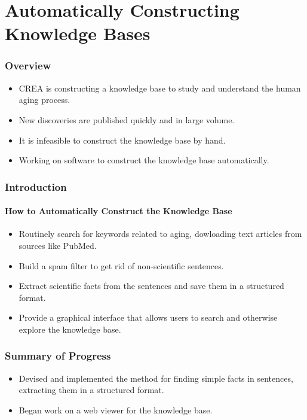 \documentclass[mathserif]{beamer}
\begin{document}
\section{Automatically Constructing Knowledge Bases}

\begin{frame}

\frametitle{Overview}

\begin{itemize}[<+->]

\item CREA is constructing a knowledge base to study and
understand the human aging process.
\item New discoveries are published quickly and in large
volume.
\item It is infeasible to construct the knowledge base by
hand.
\item Working on software to construct the knowledge base
automatically.

\end{itemize}

\end{frame}

\begin{frame}

\frametitle{Introduction}
\framesubtitle{How to Automatically Construct the Knowledge Base}

\begin{itemize}[<+->]

\item Routinely search for keywords related to aging, dowloading
text articles from sources like PubMed.
\item Build a spam filter to get rid of non-scientific sentences.
\item Extract scientific facts from the sentences and save them
in a structured format.
\item Provide a graphical interface that allows users to search
and otherwise explore the knowledge base.

\end{itemize}

\end{frame}

\begin{frame}

\frametitle{Summary of Progress}

\begin{itemize}[<+->]

\item Devised and implemented the method for finding simple facts
in sentences, extracting them in a structured format.


\item Began work on a web viewer for the knowledge base.

\end{itemize}

\end{frame}
\end{document}
